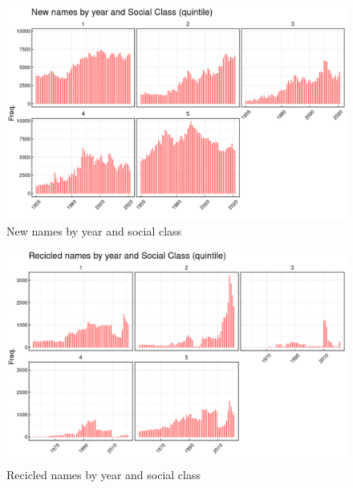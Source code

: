 \begin{figure}[H]
\begin{center}
    \includegraphics[width=15cm]{plot/p1.png}
    \caption{New names by year and social class}
    \label{fig:new_names}
\end{center}
\end{figure}


\begin{figure}[H]
\begin{center}
    \includegraphics[width=15cm]{plot/p2.png}
    \caption{Recicled names by year and social class}
    \label{fig:new_names}
\end{center}
\end{figure}




